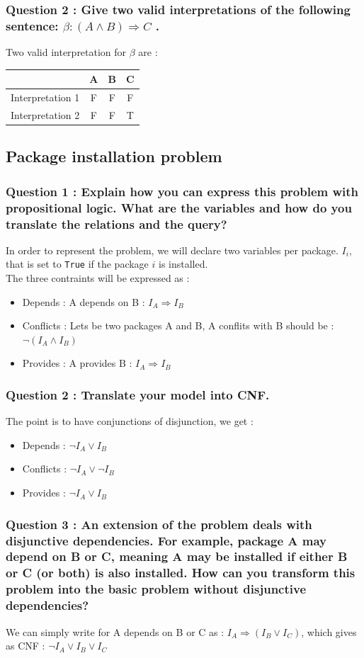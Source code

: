 \documentclass[a4paper,10pt]{article}
\begin{document}
\subsubsection*{Question 2 : Give two valid interpretations of the following sentence: $\beta : (A \wedge B) \Rightarrow C$ .}
Two valid interpretation for $\beta$ are :
\begin{center}
\begin{tabular}{|c|c|c|c|}
  \hline
   & \textbf{A} & \textbf{B} & \textbf{C} \\
  \hline
  Interpretation 1 & F & F & F \\
  \hline
  Interpretation 2 & F & F & T \\
  \hline
\end{tabular}
\end{center}
\subsection{Package installation problem}
\subsubsection{Question 1 : Explain how you can express this problem with propositional logic. What are the variables and how do you translate the relations and the query?}
In order to represent the problem, we will declare two variables per package. $I_{i}$, that is set to \texttt{True} if the package $i$ is installed.\\
The three contraints will be expressed as :
\begin{itemize}
  \item Depends : A depends on B : $I_{A} \Rightarrow I_{B}$
  \item Conflicts : Lets be two packages A and B, A conflits with B should be : $\neg (I_{A} \wedge I_{B})$ 
  \item Provides : A provides B : $I_{A} \Rightarrow I_{B}$
\end{itemize}

\subsubsection{Question 2 : Translate your model into CNF.}
The point is to have conjunctions of disjunction, we get :
\begin{itemize}
  \item Depends : $\neg I_{A} \vee I_{B}$
  \item Conflicts : $\neg I_{A} \vee \neg I_{B}$
  \item Provides : $\neg I_{A} \vee I_{B}$
\end{itemize}

\subsubsection{Question 3 : An extension of the problem deals with disjunctive dependencies. For example, package A may depend on B or C, meaning A may be installed if either B or C (or both) is also installed. How can you transform this problem into the basic problem without disjunctive dependencies?}
We can simply write for A depends on B or C as : $I_{A} \Rightarrow (I_{B} \vee I_{C})$, which gives as CNF : $\neg I_{A} \vee I_{B} \vee I_{C}$
\end{document}

